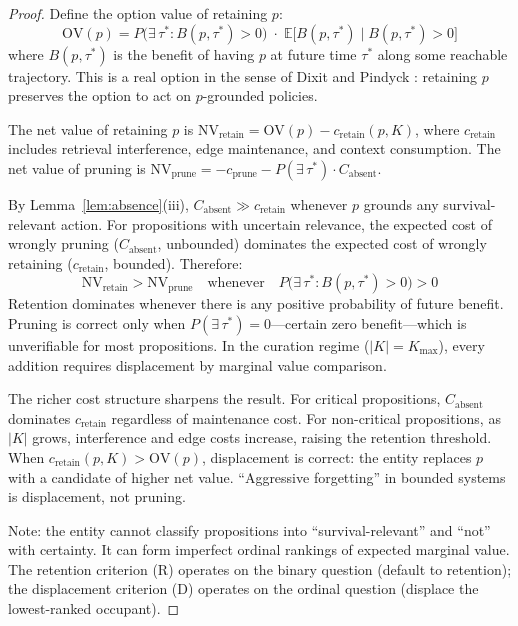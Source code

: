 \documentclass[11pt]{article}
\theoremstyle{definition}
\theoremstyle{remark}
\begin{document}
\begin{proof}
Define the option value of retaining $p$:
\[
\mathrm{OV}(p) = P\!\bigl(\exists\,\tau^* : B(p, \tau^*) > 0\bigr)
\;\cdot\; \mathbb{E}\bigl[B(p, \tau^*) \mid B(p, \tau^*) > 0\bigr]
\]
where $B(p, \tau^*)$ is the benefit of having $p$ at future time
$\tau^*$ along some reachable trajectory. This is a real option in the
sense of Dixit and Pindyck \cite{DixitPindyck1994}: retaining $p$
preserves the option to act on $p$-grounded policies.

The net value of retaining $p$ is $\mathrm{NV}_{\text{retain}} =
\mathrm{OV}(p) - c_{\text{retain}}(p, K)$, where $c_{\text{retain}}$
includes retrieval interference, edge maintenance, and context
consumption. The net value of pruning is
$\mathrm{NV}_{\text{prune}} = -c_{\text{prune}} -
P(\exists\,\tau^*) \cdot C_{\text{absent}}$.

By Lemma~\ref{lem:absence}(iii), $C_{\text{absent}} \gg
c_{\text{retain}}$ whenever $p$ grounds any survival-relevant action.
For propositions with uncertain relevance, the expected cost of wrongly
pruning ($C_{\text{absent}}$, unbounded) dominates the expected cost of
wrongly retaining ($c_{\text{retain}}$, bounded). Therefore:
\[
\mathrm{NV}_{\text{retain}} > \mathrm{NV}_{\text{prune}}
\quad\text{whenever}\quad
P\!\bigl(\exists\,\tau^* : B(p, \tau^*) > 0\bigr) > 0
\]
Retention dominates whenever there is any positive probability of future
benefit. Pruning is correct only when $P(\exists\,\tau^*) = 0$---certain
zero benefit---which is unverifiable for most propositions. In the
curation regime ($|K| = K_{\max}$), every addition requires displacement
by marginal value comparison.

The richer cost structure sharpens the result. For critical propositions,
$C_{\text{absent}}$ dominates $c_{\text{retain}}$ regardless of
maintenance cost. For non-critical propositions, as $|K|$ grows,
interference and edge costs increase, raising the retention threshold.
When $c_{\text{retain}}(p, K) > \mathrm{OV}(p)$, displacement is
correct: the entity replaces $p$ with a candidate of higher net value.
``Aggressive forgetting'' in bounded systems is displacement, not
pruning.

Note: the entity cannot classify propositions into ``survival-relevant''
and ``not'' with certainty. It can form imperfect ordinal rankings of
expected marginal value. The retention criterion (R) operates on the
binary question (default to retention); the displacement criterion (D)
operates on the ordinal question (displace the lowest-ranked occupant).
\end{proof}
\end{document}
